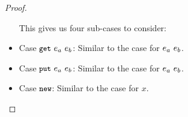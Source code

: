 \begin{proof}
\begin{itemize}
      This gives us four sub-cases to consider:


    \item Case $\mbox{\small{\texttt{get}}}~e_a~e_b$: Similar to the case for $e_a~e_b$.

    \item Case $\mbox{\small{\texttt{put}}}~e_a~e_b$: Similar to the case for $e_a~e_b$.

    \item Case $\mbox{\small{\texttt{new}}}$: Similar to the case for $x$.
  \end{itemize}
\end{proof}
